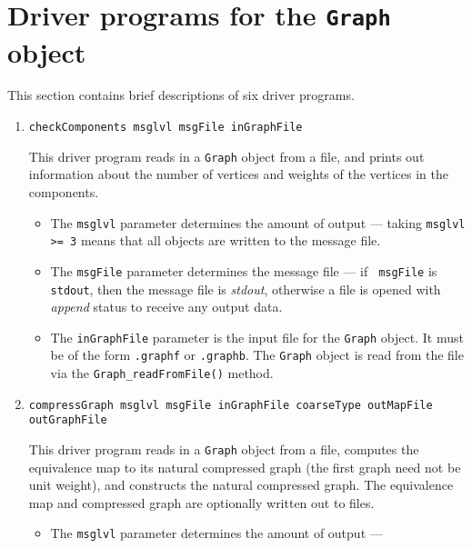 \par
\section{Driver programs for the {\tt Graph} object}
\label{section:Graph:drivers}
\par
This section contains brief descriptions of six driver programs.
\par
\begin{enumerate}
\item
\begin{verbatim}
checkComponents msglvl msgFile inGraphFile 
\end{verbatim}
This driver program reads in a {\tt Graph} object from a file,
and prints out information about the number of vertices and weights
of the vertices in the components.
\begin{itemize}
\item
The {\tt msglvl} parameter determines the amount of output ---
taking {\tt msglvl >= 3} means that all objects are written
to the message file.
\item
The {\tt msgFile} parameter determines the message file --- if {\tt
msgFile} is {\tt stdout}, then the message file is {\it stdout},
otherwise a file is opened with {\it append} status to receive any
output data.
\item
The {\tt inGraphFile} parameter is the input file for the {\tt Graph}
object. It must be of the form {\tt *.graphf} or {\tt *.graphb}.
The {\tt Graph} object is read from the file via the
{\tt Graph\_readFromFile()} method.
\end{itemize}
\item
\begin{verbatim}
compressGraph msglvl msgFile inGraphFile coarseType outMapFile outGraphFile
\end{verbatim}
This driver program reads in a {\tt Graph} object from a file,
computes the equivalence map to its natural compressed graph
(the first graph need not be unit weight), and constructs the
natural compressed graph.
The equivalence map and compressed graph are optionally written out
to files.
\begin{itemize}
\item
The {\tt msglvl} parameter determines the amount of output ---

\end{itemize}
\end{enumerate}
